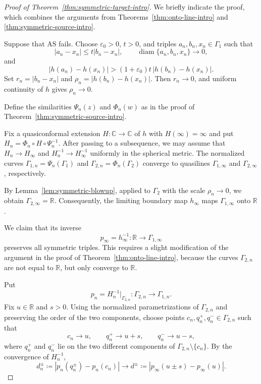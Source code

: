 \documentclass[11pt]{amsart}
\numberwithin{equation}{section}
\theoremstyle{definition} %
\theoremstyle{remarkstyle}
\newcommand{\R}{\mathbb{R}}
\newcommand{\C}{\mathbb{C}}
\newcommand{\diam}{\operatorname{diam}}
\begin{document}
\begin{proof}[Proof of Theorem~\ref{thm:symmetric-target-intro}]
We briefly indicate the proof, which combines the arguments from Theorems~\ref{thm:onto-line-intro} and \ref{thm:symmetric-source-intro}.

Suppose that $\mathrm{AS}$ fails.  Choose $\varepsilon_0>0$, $t>0$, and triples $a_n,b_n,x_n\in\Gamma_1$ such that
\begin{equation}\label{eq:sym-target-failure}
 |a_n-x_n|\leq t|b_n-x_n|,\qquad \diam\{a_n,b_n,x_n\}\to0,
\end{equation}
and
\begin{equation}\label{eq:sym-target-image-failure}
 |h(a_n)-h(x_n)|>(1+\varepsilon_0)t\,|h(b_n)-h(x_n)|.
\end{equation}
Set $r_n=|b_n-x_n|$ and $\rho_n=|h(b_n)-h(x_n)|$.
Then $r_n\to0$, and uniform continuity of $h$ gives $\rho_n\to 0$.

Define the similarities $\Psi_n(z)$ and $\Phi_n(w)$ as in the proof of
Theorem~\ref{thm:symmetric-source-intro}.

Fix a quasiconformal extension $H\colon\C\to\C $ of $h$ with $H(\infty)=\infty$ and put $H_n=\Phi_n\circ H\circ \Psi_n^{-1}$.
After passing to a subsequence, we may assume that $H_n\to H_\infty$ and $H_n^{-1}\to H_\infty^{-1}$ uniformly in the spherical metric. 
The normalized curves $\Gamma_{1,n}=\Psi_n(\Gamma_1)$ and $\Gamma_{2,n}=\Phi_n(\Gamma_2)$ converge to quasilines $\Gamma_{1,\infty}$ and $\Gamma_{2,\infty}$, respectively.

By Lemma~\ref{lem:symmetric-blowup}, applied to $\Gamma_2$ with the scale $\rho_n\to0$, we obtain $\Gamma_{2,\infty}=\R$.
Consequently, the limiting boundary map $h_\infty$ maps $\Gamma_{1,\infty}$ onto $\mathbb R$.

We claim that its inverse
\[
 p_\infty=h_\infty^{-1}\colon\R\to\Gamma_{1,\infty}
\]
preserves all symmetric  triples.  
This requires a slight modification of the argument in the proof of Theorem~\ref{thm:onto-line-intro}, because the curves $\Gamma_{2,n}$ are not equal to $\R$, but only converge to $\R$.

Put
\[
 p_n=H_n^{-1}|_{\Gamma_{2,n}}\colon\Gamma_{2,n}\to\Gamma_{1,n}.
\]
Fix $u\in\R$ and $s>0$.  
Using the normalized parametrizations of $\Gamma_{2,n}$ and preserving the order of the two components, choose points $c_n,q_n^+,q_n^-\in\Gamma_{2,n}$ such that
\[
 c_n\to u,\qquad q_n^+\to u+s,\qquad q_n^-\to u-s,
\]
where $q_n^+$ and $q_n^-$ lie on the two different components of $\Gamma_{2,n}\setminus\{c_n\}$.  
By the convergence of $H_n^{-1}$,
\[
 d_n^\pm\coloneqq  |p_n(q_n^\pm)-p_n(c_n)|\to  d^\pm \coloneqq  |p_\infty(u\pm s)-p_\infty(u)|.
\]


\end{proof}
\end{document}
